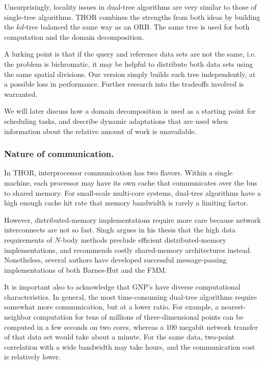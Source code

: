 \documentclass[twoside,leqno,twocolumn]{article}
\newcommand{\mysubsub}[1]{\subsubsection{#1.}}
\begin{document}
Unsurprisingly, locality issues in dual-tree algorithms are very similar to those of single-tree algorithms.
THOR combines the strengths from both ideas by building the $kd$-tree balanced the same way as an ORB.
The same tree is used for both computation and the domain decomposition.

A lurking point is that if the query and reference data sets are not the same, i.e. the problem is bichromatic, it may be helpful to distribute both data sets using the same spatial divisions.
Our version simply builds each tree independently, at a possible loss in performance.
Further research into the tradeoffs involved is warranted.

We will later discuss how a domain decomposition is used as a starting point for scheduling tasks, and describe dynamic adaptations that are used when information about the relative amount of work is unavailable.

\mysubsub{Nature of communication}

In THOR, interprocessor communication has two flavors.
Within a single machine, each processor may have its own cache that communicates over the bus to shared memory.
For small-scale multi-core systems, dual-tree algorithms have a high enough cache hit rate that memory bandwidth is rarely a limiting factor.

However, distributed-memory implementations require more care because network interconnects are not so fast.
Singh argues in his thesis \cite{singh_thesis} that the high data requirements of $N$-body methods preclude efficient distributed-memory implementations, and recommends costly shared-memory architectures instead.
Nonetheless, several authors \cite{salmon_thesis, liu94experiences, salmon97parallel} have developed successful message-passing implementations of both Barnes-Hut and the FMM.

It is important also to acknowledge that GNP's have diverse computational characteristics.
In general, the most time-consuming dual-tree algorithms require somewhat more communication, but at a lower ratio.
For example, a nearest-neighbor computation for tens of millions of three-dimensional points can be computed in a few seconds on two cores, whereas a 100 megabit network transfer of that data set would take about a minute.
For the same data, two-point correlation with a wide bandwidth may take hours, and the communication cost is relatively lower.
\end{document}
